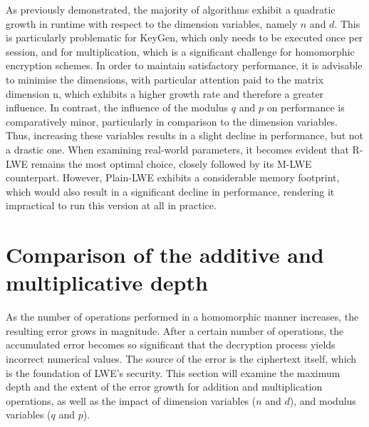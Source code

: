 As previously demonstrated, the majority of algorithms exhibit a quadratic growth in runtime with respect to the dimension variables, namely $n$ and $d$. This is particularly problematic for KeyGen, which only needs to be executed once per session, and for multiplication, which is a significant challenge for homomorphic encryption schemes. In order to maintain satisfactory performance, it is advisable to minimise the dimensions, with particular attention paid to the matrix dimension n, which exhibits a higher growth rate and therefore a greater influence. In contrast, the influence of the modulus $q$ and $p$ on performance is comparatively minor, particularly in comparison to the dimension variables. Thus, increasing these variables results in a slight decline in performance, but not a drastic one. When examining real-world parameters, it becomes evident that R-LWE remains the most optimal choice, closely followed by its M-LWE counterpart. However, Plain-LWE exhibits a considerable memory footprint, which would also result in a significant decline in performance, rendering it impractical to run this version at all in practice. 

\section{Comparison of the additive and multiplicative depth}

As the number of operations performed in a homomorphic manner increases, the resulting error grows in magnitude. After a certain number of operations, the accumulated error becomes so significant that the decryption process yields incorrect numerical values. The source of the error is the ciphertext itself, which is the foundation of LWE's security. This section will examine the maximum depth and the extent of the error growth for addition and multiplication operations, as well as the impact of dimension variables ($n$ and $d$), and modulus variables ($q$ and $p$).

